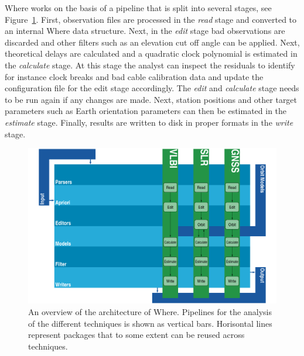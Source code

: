 \documentclass[natbib,twocolumn,twoside]{svmultiag}
\begin{document}
Where works on the basis of a pipeline that is split into several stages, see
Figure~\ref{fig:architecture}. First, observation files are processed in the
\emph{read} stage and converted to an internal Where data structure. Next, in
the \emph{edit} stage bad observations are discarded and other filters such as
an elevation cut off angle can be applied. Next, theoretical delays are
calculated and a quadratic clock polynomial is estimated in the \emph{calculate}
stage. At this stage the analyst can inspect the residuals to identify for
instance clock breaks and bad cable calibration data and update the
configuration file for the edit stage accordingly. The \emph{edit} and
\emph{calculate} stage needs to be run again if any changes are made. Next,
station positions and other target parameters such as Earth orientation
parameters can then be estimated in the \emph{estimate} stage. Finally, results
are written to disk in proper formats in the \emph{write} stage.

\begin{figure}[tb]
  \includegraphics[width=\columnwidth]{kirkvik_fig02}
  \caption{An overview of the architecture of Where. Pipelines for the analysis
    of the different techniques is shown as vertical bars. Horisontal lines
    represent packages that to some extent can be reused across techniques.}
  \label{fig:architecture}
\end{figure}
\end{document}
